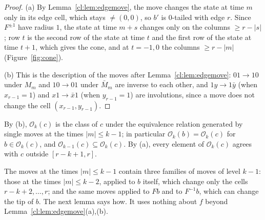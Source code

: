 \begin{proof}
(a) By Lemma~\ref{cl:lem:edgemove}, the move changes the state at time $m$ only in its edge cell, which stays $\ne(0,0)$, so $b'$ is $0$-tailed with edge $r$. Since $F^{\pm1}$ have radius $1$, the state at time $m+s$ changes only on the columns $\ge r-|s|$; row $t$ is the second row of the state at time $t$ and the first row of the state at time $t+1$, which gives the cone, and at $t=-1,0$ the columns $\ge r-|m|$ (Figure~\ref{fig:cone}).

(b) This is the description of the moves after Lemma~\ref{cl:lem:edgemove}: $01\to10$ under $M_m$ and $10\to01$ under $\bar M_m$ are inverse to each other, and $1y\to1\bar y$ (when $x_{r-1}=1$) and $x1\to\bar x1$ (when $y_{r-1}=1$) are involutions, since a move does not change the cell $(x_{r-1},y_{r-1})$.
\end{proof}


By (b), $\mathcal O_k(c)$ is the class of $c$ under the equivalence relation generated by single moves at the times $|m|\le k-1$; in particular $\mathcal O_k(b)=\mathcal O_k(c)$ for $b\in\mathcal O_k(c)$, and $\mathcal O_{k-1}(c)\subseteq\mathcal O_k(c)$. By (a), every element of $\mathcal O_k(c)$ agrees with $c$ outside $[r-k+1,r]$.

The moves at the times $|m|\le k-1$ contain three families of moves of level $k-1$: those at the times $|m|\le k-2$, applied to $b$ itself, which change only the cells $r-k+2,\dots,r$; and the same moves applied to $Fb$ and to $F^{-1}b$, which can change the tip of $b$. The next lemma says how. It uses nothing about $f$ beyond Lemma~\ref{cl:lem:edgemove}(a),(b).

